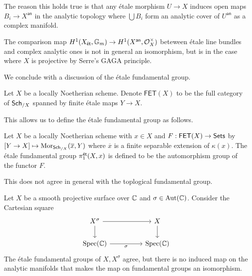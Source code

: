 The reason this holds true is that any \'{e}tale morphism $U\to X$ induces open maps $B_{i}\to X^{\mathsf{an}}$ in the analytic topology where $\bigcup B_{i}$ form an analytic cover of $U^{\mathsf{an}}$ as a complex manifold. 
\begin{remark}
    The comparison map $H^{1}(X_{\mathsf{\acute{e}t}},\mathbb{G}_{m})\to H^{1}(X^{\mathsf{an}},\mathcal{O}_{X}^{\times})$ beteween \'{e}tale line bundles and complex analytic ones is not in general an isomorphism, but is in the case where $X$ is projective by Serre's GAGA principle. 
\end{remark}
We conclude with a discussion of the \'{e}tale fundamental group. 
\begin{definition}\label{def: finite etale category}
    Let $X$ be a locally Noetherian scheme. Denote $\mathsf{FET}(X)$ to be the full category of $\mathsf{Sch}_{/X}$ spanned by finite \'{e}tale maps $Y\to X$. 
\end{definition}
This allows us to define the \'{e}tale fundamental group as follows. 
\begin{definition}\label{def: etale fundamental group}
    Let $X$ be a locally Noetherian scheme with $x\in X$ and $F:\mathsf{FET}(X)\to\mathsf{Sets}$ by $[Y\to X]\mapsto\mathrm{Mor}_{\mathsf{Sch}_{/X}}(\overline{x},Y)$ where $\overline{x}$ is a finite separable extension of $\kappa(x)$. The \'{e}tale fundamental group $\pi_{1}^{\mathsf{\acute{e}t}}(X,x)$ is defined to be the automorphism group of the functor $F$. 
\end{definition}
This does not agree in general with the toplogical fundamental group. 
\begin{example}
    Let $X$ be a smooth projective surface over $\mathbb{C}$ and $\sigma\in\mathrm{Aut}(\mathbb{C})$. Consider the Cartesian square 
    $$%
    \begin{tikzcd}
        {X^{\sigma}} && X \\
        {\spec(\CC)} && {\spec(\CC)}
        \arrow[from=1-1, to=1-3]
        \arrow[from=1-1, to=2-1]
        \arrow[from=1-3, to=2-3]
        \arrow["\sigma"', from=2-1, to=2-3]
    \end{tikzcd}$$
    The \'{e}tale fundamental groups of $X,X^{\sigma}$ agree, but there is no induced map on the analytic manifolds that makes the map on fundamental groups an isomorphism. 
\end{example}